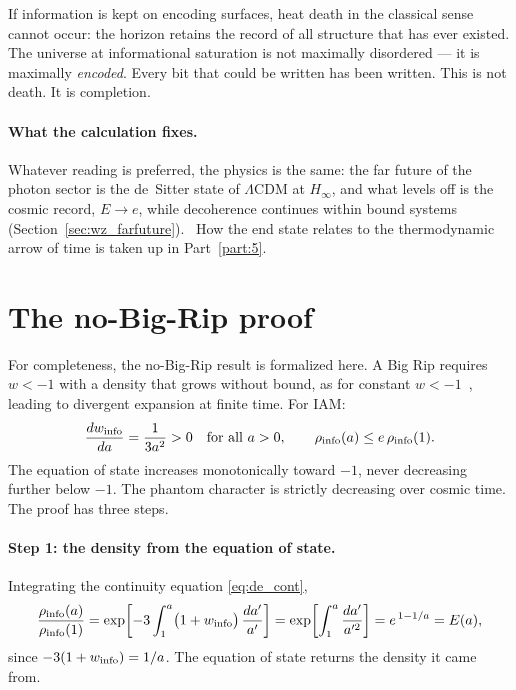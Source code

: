 If information is kept on encoding surfaces, heat death in the classical sense cannot occur: the horizon retains the record of all structure that
has ever existed. The universe at informational saturation is not maximally disordered --- it is maximally \emph{encoded}. Every bit that could be
written has been written. This is not death. It is completion. \interp

\paragraph{What the calculation fixes.} Whatever reading is preferred, the physics is the same: the far future of the photon sector is the
de~Sitter state of $\Lambda$CDM at $H_\infty$, and what levels off is the cosmic record, $E\to e$, while decoherence continues within bound systems (Section~\ref{sec:wz_farfuture}). \calc\ How the end
state relates to the thermodynamic arrow of time is taken up in Part~\ref{part:5}.

\section{The no-Big-Rip proof}\label{sec:wz_norip}
For completeness, the no-Big-Rip result is formalized here. A Big Rip requires $w<-1$ with a density that grows without bound, as for constant
$w<-1$~\cite{Caldwell2002,Caldwell2003}, leading to divergent expansion at finite time. For IAM:
\begin{equation}\frac{dw_{\rm info}}{da}=\frac{1}{3a^2}>0\quad\text{for all }a>0,\qquad\rho_{\rm info}(a)\le e\,\rho_{\rm info}(1).\label{eq:wz_norip}\end{equation}
The equation of state increases monotonically toward $-1$, never decreasing further below $-1$. The phantom character is strictly decreasing over
cosmic time. The proof has three steps.

\paragraph{Step 1: the density from the equation of state.} Integrating the continuity equation \eqref{eq:de_cont},
\begin{equation}\frac{\rho_{\rm info}(a)}{\rho_{\rm info}(1)}=\exp\!\left[-3\int_1^a\bigl(1+w_{\rm info}\bigr)\,\frac{da'}{a'}\right]
=\exp\!\left[\int_1^a\frac{da'}{a'^2}\right]=e^{\,1-1/a}=E(a),\label{eq:wz_rho_from_w}\end{equation}
since $-3(1+w_{\rm info})=1/a$. The equation of state returns the density it came from. \derived

